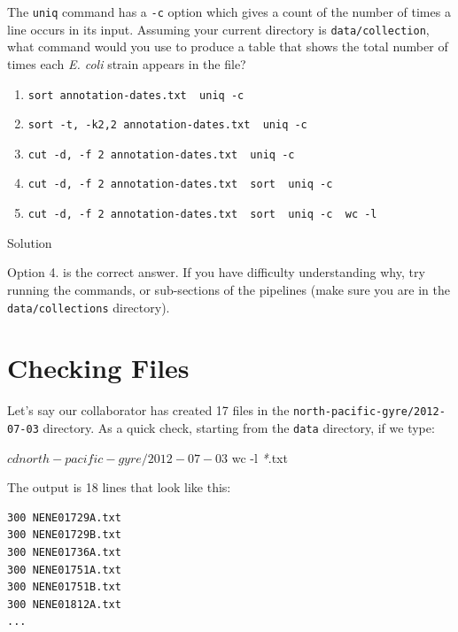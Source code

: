 \documentclass[
]{book}
\newenvironment{Shaded}{\begin{snugshade}}{\end{snugshade}}
\newcommand{\AttributeTok}[1]{\textcolor[rgb]{0.13,0.29,0.53}{#1}}
\newcommand{\ExtensionTok}[1]{#1}
\newcommand{\NormalTok}[1]{#1}
\newcommand{\PreprocessorTok}[1]{\textcolor[rgb]{0.56,0.35,0.01}{\textit{#1}}}
\providecommand{\tightlist}{%
  \setlength{\itemsep}{0pt}\setlength{\parskip}{0pt}}
\begin{document}
The \texttt{uniq} command has a \texttt{-c} option which gives a count of the number of times a line occurs in its input. Assuming your current directory is \texttt{data/collection}, what command would you use to produce a table that shows the total number of times each \emph{E. coli} strain appears in the file?

\begin{enumerate}
\def\labelenumi{\arabic{enumi}.}
\tightlist
\item
  \texttt{sort\ annotation-dates.txt\ \textbar{}\ uniq\ -c}
\item
  \texttt{sort\ -t,\ -k2,2\ annotation-dates.txt\ \textbar{}\ uniq\ -c}
\item
  \texttt{cut\ -d,\ -f\ 2\ annotation-dates.txt\ \textbar{}\ uniq\ -c}
\item
  \texttt{cut\ -d,\ -f\ 2\ annotation-dates.txt\ \textbar{}\ sort\ \textbar{}\ uniq\ -c}
\item
  \texttt{cut\ -d,\ -f\ 2\ annotation-dates.txt\ \textbar{}\ sort\ \textbar{}\ uniq\ -c\ \textbar{}\ wc\ -l}
\end{enumerate}

Solution

Option 4. is the correct answer. If you have difficulty understanding why, try running the commands, or sub-sections of the pipelines (make sure you are in the \texttt{data/collections} directory).

\section{Checking Files}\label{checking-files}

Let's say our collaborator has created 17 files in the \texttt{north-pacific-gyre/2012-07-03} directory. As a quick check, starting from the \texttt{data} directory, if we type:

\begin{Shaded}
\begin{Highlighting}[]
\ExtensionTok{$}\NormalTok{ cd north{-}pacific{-}gyre/2012{-}07{-}03}
\ExtensionTok{$}\NormalTok{ wc }\AttributeTok{{-}l} \PreprocessorTok{*}\NormalTok{.txt}
\end{Highlighting}
\end{Shaded}

The output is 18 lines that look like this:

\begin{verbatim}
300 NENE01729A.txt
300 NENE01729B.txt
300 NENE01736A.txt
300 NENE01751A.txt
300 NENE01751B.txt
300 NENE01812A.txt
...
\end{verbatim}
\end{document}
